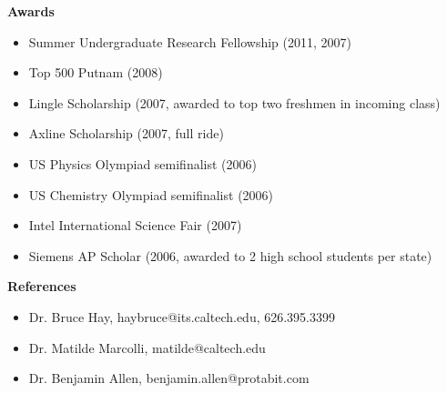 \documentclass[letterpaper,11pt]{article}
\newcommand{\resheading}[1]{{\large \colorbox{mygrey}{\begin{minipage}{\textwidth}{\textbf{#1 \vphantom{p\^{E}}}}\end{minipage}}}}
\begin{document}
\resheading{Awards}
\begin{itemize}
    \item Summer Undergraduate Research Fellowship (2011, 2007)
	\item Top 500 Putnam (2008)
	\item Lingle Scholarship (2007, awarded to top two freshmen in incoming class)
	\item Axline Scholarship (2007, full ride)
	\item US Physics Olympiad semifinalist (2006)
	\item US Chemistry Olympiad semifinalist (2006)
	\item Intel International Science Fair (2007)
	\item Siemens AP Scholar (2006, awarded to 2 high school students per state)
\end{itemize}

\resheading{References}
\begin{itemize}
\item Dr. Bruce Hay, haybruce@its.caltech.edu, 626.395.3399
\item Dr. Matilde Marcolli, matilde@caltech.edu
\item Dr. Benjamin Allen, benjamin.allen@protabit.com
\end{itemize}
\end{document}
